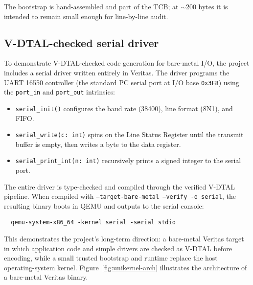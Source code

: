 The bootstrap is hand-assembled and part of the TCB; at $\sim$200 bytes it is intended to remain small enough for line-by-line audit.

\subsection{V-DTAL-checked serial driver}

To demonstrate V-DTAL-checked code generation for bare-metal I/O, the project includes a serial driver written entirely in Veritas. The driver programs the UART 16550 controller (the standard PC serial port at I/O base \texttt{0x3F8}) using the \texttt{port\_in} and \texttt{port\_out} intrinsics:

\begin{itemize}
  \item \texttt{serial\_init()} configures the baud rate (38400), line format (8N1), and FIFO.
  \item \texttt{serial\_write(c: int)} spins on the Line Status Register until the transmit buffer is empty, then writes a byte to the data register.
  \item \texttt{serial\_print\_int(n: int)} recursively prints a signed integer to the serial port.
\end{itemize}

The entire driver is type-checked and compiled through the verified V-DTAL pipeline. When compiled with \texttt{--target-bare-metal --verify -o serial}, the resulting binary boots in QEMU and outputs to the serial console:

\begin{verbatim}
  qemu-system-x86_64 -kernel serial -serial stdio
\end{verbatim}

This demonstrates the project's long-term direction: a bare-metal Veritas target in which application code and simple drivers are checked as V-DTAL before encoding, while a small trusted bootstrap and runtime replace the host operating-system kernel. Figure~\ref{fig:unikernel-arch} illustrates the architecture of a bare-metal Veritas binary.

